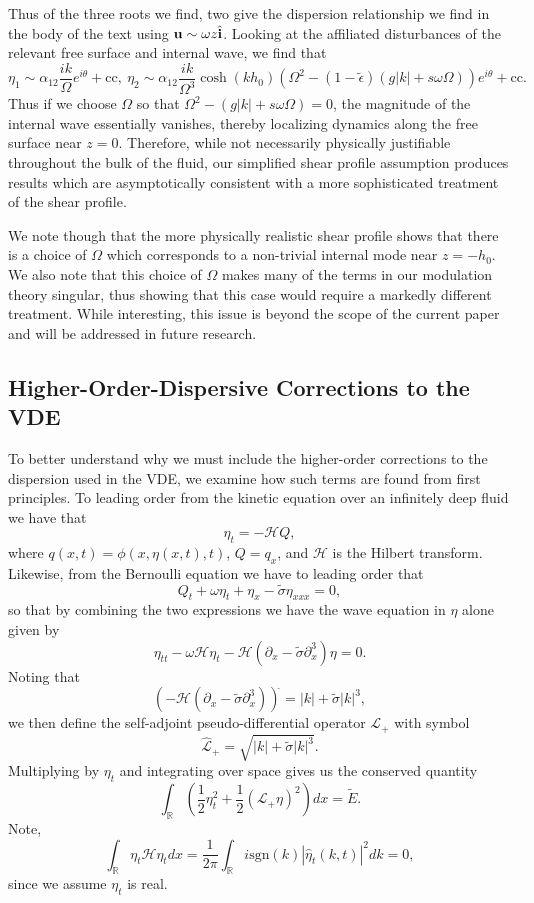 \documentclass[a4paper,11pt]{article}
\newcommand{\pd}{\partial}
\begin{document}
Thus of the three roots we find, two give the dispersion relationship we find in the body of the text using ${\bf u}\sim \omega z \hat{{\bf i}}$.  Looking at the affiliated disturbances of the relevant free surface and internal wave, we find that  
\[
\eta_{1} \sim \alpha_{12}\frac{ik}{\Omega}e^{i\theta} + \mbox{cc}, ~ \eta_{2} \sim \alpha_{12}\frac{ik}{\Omega^{3}}\cosh(kh_{0})\left(\Omega^{2}-(1-\tilde{\epsilon})\left( g|k|+s\omega\Omega\right)\right)e^{i\theta}+ \mbox{cc}.
\]
Thus if we choose $\Omega$ so that $\Omega^{2}-\left( g|k|+s\omega\Omega\right)= 0$, the magnitude of the internal wave essentially vanishes, thereby localizing dynamics along the free surface near $z=0$.  Therefore, while not necessarily physically justifiable throughout the bulk of the fluid, our simplified shear profile assumption produces results which are asymptotically consistent with a more sophisticated treatment of the shear profile.  

We note though that the more physically realistic shear profile shows that there is a choice of $\Omega$ which corresponds to a non-trivial internal mode near $z=-h_{0}$.  We also note that this choice of $\Omega$ makes many of the terms in our modulation theory singular, thus showing that this case would require a markedly different treatment.  While interesting, this issue is beyond the scope of the current paper and will be addressed in future research. 

\subsection*{Higher-Order-Dispersive Corrections to the VDE}

To better understand why we must include the higher-order corrections to the dispersion used in the VDE, we examine how such terms are found from first principles.  To leading order from the kinetic equation over an infinitely deep fluid we have that 
\[
\eta_{t} = -\mathcal{H}Q,
\]
where $q(x,t) = \phi(x,\eta(x,t),t)$, $Q = q_{x}$, and $\mathcal{H}$ is the Hilbert transform.  Likewise, from the Bernoulli equation we have to leading order that
\[
Q _{t}+ \omega\eta_{t} + \eta_{x} -\tilde{\sigma}\eta_{xxx}= 0, 
\]
so that by combining the two expressions we have the wave equation in $\eta$ alone given by 
\begin{equation}
\eta_{tt}- \omega\mathcal{H}\eta_{t} - \mathcal{H} \left(\pd_{x} -\tilde{\sigma}\pd^{3}_{x}\right)\eta= 0.
\label{linearwaveeq}
\end{equation}
Noting that 
\[
\left(-\mathcal{H}\left(\pd_{x} - \tilde{\sigma}\pd^{3}_{x}\right)\right)^{\widehat{}} = \left|k\right| + \tilde{\sigma}\left|k\right|^{3},
\]
we then define the self-adjoint pseudo-differential operator $\mathcal{L}_{+}$ with symbol 
\[
\mathcal{\widehat{L}}_{+} = \sqrt{\left|k\right| + \tilde{\sigma}\left|k\right|^{3}}.
\]
Multiplying by $\eta_{t}$ and integrating over space gives us the conserved quantity
\[
\int_{\mathbb{R}} \left(\frac{1}{2}\eta_{t}^{2} + \frac{1}{2}\left(\mathcal{L}_{+}\eta \right)^{2}\right) dx = \tilde{E}.
\]
Note, 
\[
\int_{\mathbb{R}}\eta_{t}\mathcal{H}\eta_{t} dx = \frac{1}{2\pi}\int_{\mathbb{R}} i\mbox{sgn}(k) \left|\hat{\eta}_{t}(k,t) \right|^{2} dk = 0,
\]
since we assume $\eta_{t}$ is real.  
\end{document}
